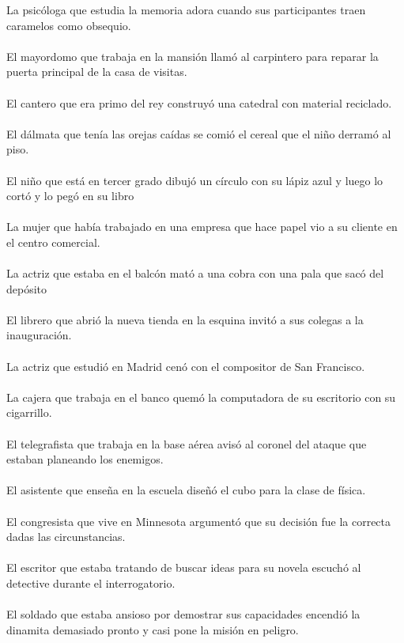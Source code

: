 La psicóloga que estudia la memoria adora cuando sus participantes traen caramelos como obsequio.	\\	\\
El mayordomo que trabaja en la mansión llamó al carpintero para reparar la puerta principal de la casa de visitas.	\\	\\
El cantero que era primo del rey construyó una catedral con material reciclado.	\\	\\
El dálmata que tenía las orejas caídas se comió el cereal que el niño derramó al piso.	\\	\\
El niño que está en tercer grado dibujó un círculo con su lápiz azul y luego lo cortó y lo pegó en su libro	\\	\\
La mujer que había trabajado en una empresa que hace papel vio a su cliente en el centro comercial.	\\	\\
La actriz que estaba en el balcón mató a una cobra con una pala que sacó del depósito	\\	\\
El librero que abrió la nueva tienda en la esquina invitó a sus colegas a la inauguración.	\\	\\
La actriz que estudió en Madrid cenó con el compositor de San Francisco.	\\	\\
La cajera que trabaja en el banco quemó la computadora de su escritorio con su cigarrillo.	\\	\\
El telegrafista que trabaja en la base aérea avisó al coronel del ataque que estaban planeando los enemigos.	\\	\\
El asistente que enseña en la escuela diseñó el cubo para la clase de física.	\\	\\
El congresista que vive en Minnesota argumentó que su decisión fue la correcta dadas las circunstancias.	\\	\\
El escritor que estaba tratando de buscar ideas para su novela escuchó al detective durante el interrogatorio.	\\	\\
El soldado que estaba ansioso por demostrar sus capacidades encendió la dinamita demasiado pronto y casi pone la misión en peligro.	\\	\\

